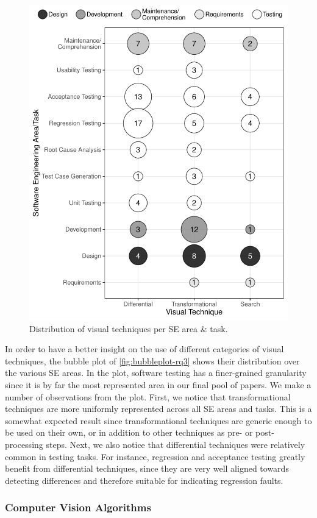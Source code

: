 \begin{figure}
    \centering
    \includegraphics[width=0.8\linewidth]{survey/figures/bubbleplot-rq3}
    \caption{Distribution of visual techniques per SE area \& task.}\label{fig:bubbleplot-rq3}
\end{figure}


In order to have a better insight on the use of different 
categories of visual techniques,
the bubble plot of \autoref{fig:bubbleplot-rq3} shows their distribution over the various SE areas.
In the plot, software testing has a finer-grained granularity
since it is by far the most represented area in our final pool of papers.
We make a number of observations from the plot.
First, we notice that transformational techniques are more uniformly represented across all SE areas and tasks.
This is a somewhat expected result 
since transformational techniques are generic enough to be used 
on their own, or in addition to other techniques as pre- or post-processing steps. 
Next, we also notice that differential techniques were relatively common in testing tasks.
For instance, regression and acceptance testing greatly benefit from differential techniques,
since they are very well aligned towards detecting differences and therefore suitable for indicating regression faults.

    
\subsubsection{Computer Vision Algorithms}
\label{sec:CV-algos}

